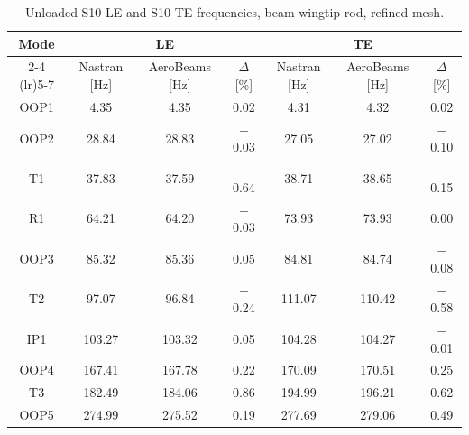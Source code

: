 \documentclass[journal]{new-aiaa}
\begin{document}
\begin{table}[ht!]
    \centering
    \caption{Unloaded S10 LE and S10 TE frequencies, beam wingtip rod, refined mesh.}
    \label{tab:S10_beamrod_modal_frequencies}
    \setlength{\tabcolsep}{4pt}
    \begin{tabular}{c ccc ccc}
        \toprule
        \multirow{2}{*}{Mode} & \multicolumn{3}{c}{LE} & \multicolumn{3}{c}{TE} \\
        \cmidrule(lr){2-4} \cmidrule(lr){5-7}
        & Nastran [Hz] & AeroBeams [Hz] & $\Delta$ [\%] & Nastran [Hz] & AeroBeams [Hz] & $\Delta$ [\%] \\
        \midrule
        OOP1 & 4.35 & 4.35 & 0.02 & 4.31 & 4.32 & 0.02 \\
        OOP2 & 28.84 & 28.83 & $-$0.03 & 27.05 & 27.02 & $-$0.10 \\
        T1 & 37.83 & 37.59 & $-$0.64 & 38.71 & 38.65 & $-$0.15 \\
        R1 & 64.21 & 64.20 & $-$0.03 & 73.93 & 73.93 & 0.00 \\
        OOP3 & 85.32 & 85.36 & 0.05 & 84.81 & 84.74 & $-$0.08 \\
        T2 & 97.07 & 96.84 & $-$0.24 & 111.07 & 110.42 & $-$0.58 \\
        IP1 & 103.27 & 103.32 & 0.05 & 104.28 & 104.27 & $-$0.01 \\
        OOP4 & 167.41 & 167.78 & 0.22 & 170.09 & 170.51 & 0.25 \\
        T3 & 182.49 & 184.06 & 0.86 & 194.99 & 196.21 & 0.62 \\
        OOP5 & 274.99 & 275.52 & 0.19 & 277.69 & 279.06 & 0.49 \\
        \bottomrule
    \end{tabular}
\end{table}
\end{document}
